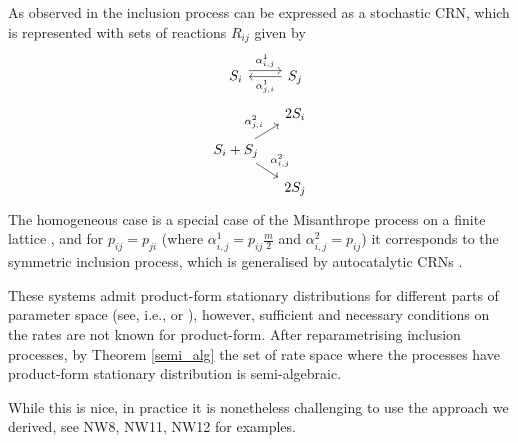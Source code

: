 \documentclass{amsart}
\theoremstyle{definition}
\theoremstyle{remark}
\theoremstyle{Conjecture/open problem}
\theoremstyle{assumption}
\theoremstyle{conjecture}
\def\a{\alpha}
\numberwithin{equation}{section}
\begin{document}
 As observed in \cite{hoesslysta} the inclusion process can be expressed as a stochastic CRN, which is represented with sets of reactions $R_{ij}$ given by
$$\begin{tikzcd} [ row sep=1em,
  column sep=1em]
S_i\arrow[r, shift left=1ex,"\a_{i,j}^1"]  &S_j \arrow[l,"\a_{j,i}^1"]\\ 
  &2S_i \\ 
S_i+S_j \arrow[ru, "\a_{j,i}^2"] \arrow[dr,"\a_{i,j}^2"] \\
& 2S_j
\end{tikzcd}
$$
The homogeneous case is a special case of the Misanthrope process on a finite lattice \cite{Cocozza-Thivent1985}, and for $p_{ij}=p_{ji}$ (where $\a_{i,j}^1 = p_{ij}\frac{m}{2}$ and $\a_{i,j}^2=p_{ij}$) it corresponds to the symmetric inclusion process, which is generalised by autocatalytic CRNs \cite{hoesslysta}.

 These systems admit product-form stationary distributions for different parts of parameter space (see, i.e., \cite{inclusion_proc} or \cite{hoesslysta}), however, sufficient and necessary conditions on the rates are not known for product-form. After reparametrising inclusion processes, by Theorem \ref{semi_alg} the set of rate space where the processes have product-form stationary distribution is semi-algebraic.


While this is nice, in practice it is nonetheless challenging to use the approach we derived, see NW8, NW11, NW12 for examples.
\end{document}
